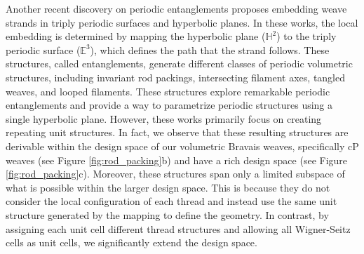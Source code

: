\documentclass[unnumsec,webpdf,contemporary,large]{oup-authoring-template}%
\theoremstyle{thmstyleone}%
\theoremstyle{thmstyletwo}%
\theoremstyle{thmstylethree}%
\begin{document}
{%

Another recent discovery on periodic entanglements \cite{periodic_entanglement_1, periodic_entanglement_2, periodic_entanglement_3, ideal_geometry_periodic_entanglement_2, 3periodicentanglement} proposes embedding weave strands in triply periodic surfaces and hyperbolic planes. In these works, the local embedding is determined by mapping the hyperbolic plane ($\mathbb{H}^2$) to the triply periodic surface ($\mathbb{E}^3$), which defines the path that the strand follows. These structures, called entanglements, generate different classes of periodic volumetric structures, including invariant rod packings, intersecting filament axes, tangled weaves, and looped filaments. These structures explore remarkable periodic entanglements and provide a way to parametrize periodic structures using a single hyperbolic plane. However, these works primarily focus on creating repeating unit structures. In fact, we observe that these resulting structures are derivable within the design space of our volumetric Bravais weaves, specifically cP weaves (see Figure \ref{fig:rod_packing}b) and have a rich design space (see Figure \ref{fig:rod_packing}c). Moreover, these structures span only a limited subspace of what is possible within the larger design space. This is because they do not consider the local configuration of each thread and instead use the same unit structure generated by the mapping to define the geometry. In contrast, by assigning each unit cell different thread structures and allowing all Wigner-Seitz cells as unit cells, we significantly extend the design space.


}
\end{document}
